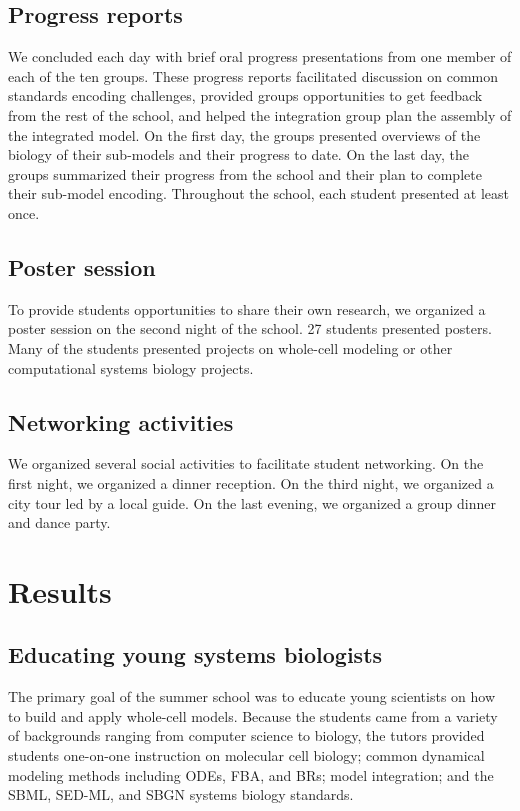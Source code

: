 \documentclass[journal,transmag]{IEEEtran}
\begin{document}
\subsection{Progress reports}
We concluded each day with brief oral progress presentations from one member of each of the ten groups. These progress reports facilitated discussion on common standards encoding challenges, provided groups opportunities to get feedback from the rest of the school, and helped the integration group plan the assembly of the integrated model. On the first day, the groups presented overviews of the biology of their sub-models and their progress to date. On the last day, the groups summarized their progress from the school and their plan to complete their sub-model encoding. Throughout the school, each student presented at least once.

\subsection{Poster session}
To provide students opportunities to share their own research, we organized a poster session on the second night of the school. 
27 students presented posters. Many of the students presented projects on whole-cell modeling or other computational systems biology projects.

\subsection{Networking activities}
We organized several social activities to facilitate student networking. On the first night, we organized a dinner reception. On the third night, we organized a city tour led by a local guide. On the last evening, we organized a group dinner and dance party.

\section{Results}

\subsection{Educating young systems biologists}
The primary goal of the summer school was to educate young scientists on how to build and apply whole-cell models. Because the students came from a variety of backgrounds ranging from computer science to biology, the tutors provided students one-on-one instruction on molecular cell biology; common dynamical modeling methods including ODEs, FBA, and BRs; model integration; and the SBML, SED-ML, and SBGN systems biology standards.
\end{document}
